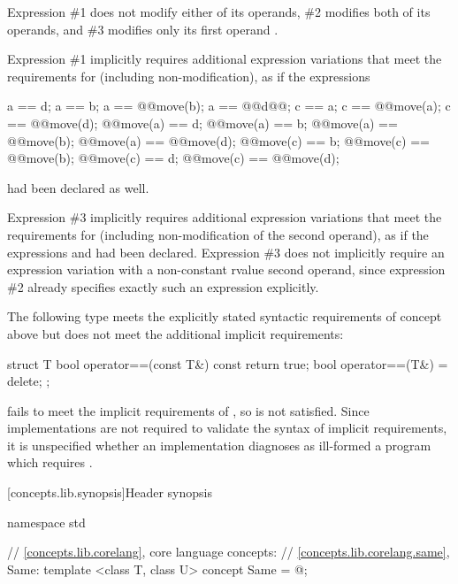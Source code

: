 \begin{addedblock}
Expression \#1 does not modify either of its operands, \#2 modifies both of its
operands, and \#3 modifies only its first operand .

Expression \#1 implicitly requires additional expression variations that meet the
requirements for  (including non-modification), as if the expressions
\begin{codeblock}
a == d;                       a == b;                       a == @@move(b); a == @@d@\newtxt{)}@;
c == a;                       c == @@move(a);            c == @@move(d);
@@move(a) == d;            @@move(a) == b;
@@move(a) == @@move(b); @@move(a) == @@move(d);
@@move(c) == b;            @@move(c) == @@move(b);
@@move(c) == d;            @@move(c) == @@move(d);
\end{codeblock}
had been declared as well.

Expression \#3 implicitly requires additional expression variations that meet the
requirements for  (including non-modification of the second operand),
as if the expressions  and  had been declared.
Expression \#3 does not implicitly require an expression variation with a
non-constant rvalue second operand, since expression \#2 already specifies exactly
such an expression explicitly.
\exitexample

\enterexample
The following type  meets the explicitly stated syntactic requirements
of concept  above but does not meet the additional implicit requirements:

\begin{codeblock}
struct T {
  bool operator==(const T&) const { return true; }
  bool operator==(T&) = delete;
};
\end{codeblock}

 fails to meet the implicit
requirements of , so  is not satisfied. Since
implementations are not required to validate the syntax of implicit requirements, it
is unspecified whether  an implementation diagnoses as ill-formed a program
which requires .
\exitexample

[concepts.lib.synopsis]{Header  synopsis}

%
\begin{codeblock}
namespace std {
  // \ref{concepts.lib.corelang}, core language concepts:
  // \ref{concepts.lib.corelang.same}, Same:
  template <class T, class U>
  concept Same = @\seebelow@;

}
\end{codeblock}
\end{addedblock}
